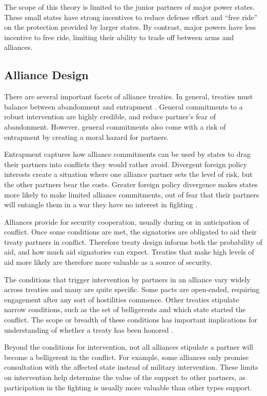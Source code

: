 \documentclass[12pt]{article}
\begin{document}
The scope of this theory is limited to the junior partners of major power states. These small states have strong incentives to reduce defense effort and ``free ride'' on the protection provided by larger states. By contrast, major powers have less incentive to free ride, limiting their ability to trade off between arms and alliances. 


\subsection*{Alliance Design}

There are several important facets of alliance treaties. In general, treaties must balance between abandonment and entrapment \citep{Snyder1984, Benson2012}. General commitments to a robust intervention are highly credible, and reduce partner's fear of abandonment. However, general commitments also come with a risk of entrapment by creating a moral hazard for partners. 

Entrapment captures how alliance commitments can be used by states to drag their partners into conflicts they would rather avoid. Divergent foreign policy interests create a situation where one alliance partner sets the level of risk, but the other partners bear the costs. Greater foreign policy divergence makes states more likely to make limited alliance commitments, out of fear that their partners will entangle them in a war they have no interest in fighting \citep{Benson2012}. 

Alliances provide for security cooperation, usually during or in anticipation of conflict. Once some conditions are met, the signatories are obligated to aid their treaty partners in conflict. Therefore treaty design informs both the probability of aid, and how much aid signatories can expect. Treaties that make high levels of aid more likely are therefore more valuable as a source of security. 

The conditions that trigger intervention by partners in an alliance vary widely across treaties and many are quite specific. Some pacts are open-ended, requiring engagement after any sort of hostilities commence. Other treaties stipulate narrow conditions, such as the set of belligerents and which state started the conflict. The scope or breadth of these conditions has important implications for understanding of whether a treaty has been honored \citep{Leedsetal2000}. 

Beyond the conditions for intervention, not all alliances stipulate a partner will become a belligerent in the conflict. For example, some alliances only promise consultation with the affected state instead of military intervention. These limits on intervention help determine the value of the support to other partners, as participation in the fighting is usually more valuable than other types support. 
\end{document}
